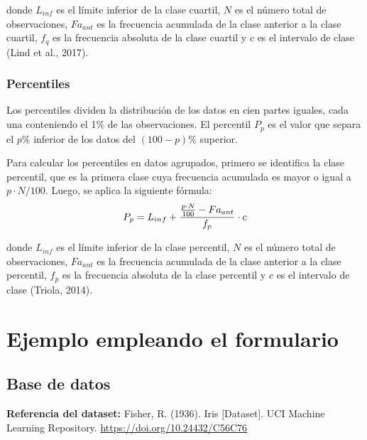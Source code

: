 \documentclass[
  spanish,
  letterpaper,
]{book}
\begin{document}
donde \(L_{inf}\)\hspace{0pt} es el límite inferior de la clase cuartil,
\(N\) es el número total de observaciones, \(Fa_{ant}\)\hspace{0pt} es
la frecuencia acumulada de la clase anterior a la clase cuartil,
\(f_q\)\hspace{0pt} es la frecuencia absoluta de la clase cuartil y
\(c\) es el intervalo de clase (Lind et al., 2017).

\subsection{Percentiles}\label{percentiles-2}

Los percentiles dividen la distribución de los datos en cien partes
iguales, cada una conteniendo el 1\% de las observaciones. El percentil
\(P_p\)\hspace{0pt} es el valor que separa el \(p \%\) inferior de los
datos del \((100−p) \%\) superior.

Para calcular los percentiles en datos agrupados, primero se identifica
la clase percentil, que es la primera clase cuya frecuencia acumulada es
mayor o igual a \(p \cdot N/100\). Luego, se aplica la siguiente
fórmula:
\[\LARGE P_p = L_{inf} + \frac{\frac{p \cdot N}{100} - Fa_{ant}}{f_p} \cdot c\]

donde \(L_{inf}\)\hspace{0pt} es el límite inferior de la clase
percentil, \(N\) es el número total de observaciones,
\(Fa_{ant}\)\hspace{0pt} es la frecuencia acumulada de la clase anterior
a la clase percentil, \(f_p\)\hspace{0pt} es la frecuencia absoluta de
la clase percentil y \(c\) es el intervalo de clase (Triola, 2014).


\chapter{Ejemplo empleando el
formulario}\label{ejemplo-empleando-el-formulario}

\section{Base de datos}\label{base-de-datos-1}

\textbf{Referencia del dataset:} Fisher, R. (1936). Iris {[}Dataset{]}.
UCI Machine Learning Repository. \url{https://doi.org/10.24432/C56C76}
\end{document}
